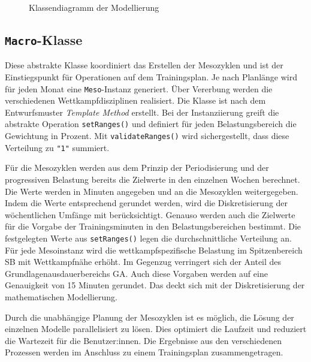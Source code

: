 \begin{figure}[htb]
    \caption{Klassendiagramm der Modellierung}
    \label{fig:uml:solver}
\end{figure}

\subsection{\texttt{Macro}-Klasse}
Diese abstrakte Klasse koordiniert das Erstellen der Mesozyklen und ist der Einstiegspunkt für Operationen auf dem Trainingsplan. Je nach Planlänge wird für jeden Monat eine \texttt{Meso}-Instanz generiert. Über Vererbung werden die verschiedenen Wettkampfdisziplinen realisiert. Die Klasse ist nach dem Entwurfsmuster \textit{Template Method} erstellt. Bei der Instanziierung greift die abstrakte Operation \texttt{setRanges()} und definiert für jeden Belastungsbereich die Gewichtung in Prozent. Mit \texttt{validateRanges()} wird sichergestellt, dass diese Verteilung zu \texttt{"1"} summiert.\par
Für die Mesozyklen werden aus dem Prinzip der Periodisierung und der progressiven Belastung bereits die Zielwerte in den einzelnen Wochen berechnet. Die Werte werden in Minuten angegeben und an die Mesozyklen weitergegeben. Indem die Werte entsprechend gerundet werden, wird die Diskretisierung der wöchentlichen Umfänge mit berücksichtigt.\newline
Genauso werden auch die Zielwerte für die Vorgabe der Trainingsminuten in den Belastungsbereichen bestimmt. Die festgelegten Werte aus \texttt{setRanges()} legen die durchschnittliche Verteilung an. Für jede Mesoinstanz wird die wettkampfspezifische Belastung im Spitzenbereich SB mit Wettkampfnähe erhöht. Im Gegenzug verringert sich der Anteil des Grundlagenausdauerbereichs GA. Auch diese Vorgaben werden auf eine Genauigkeit von 15 Minuten gerundet. Das deckt sich mit der Diskretisierung der mathematischen Modellierung. \par
Durch die unabhängige Planung der Mesozyklen ist es möglich, die Lösung der einzelnen Modelle parallelisiert zu lösen. Dies optimiert die Laufzeit und reduziert die Wartezeit für die Benutzer:innen. Die Ergebnisse aus den verschiedenen Prozessen werden im Anschluss zu einem Trainingsplan zusammengetragen. 

